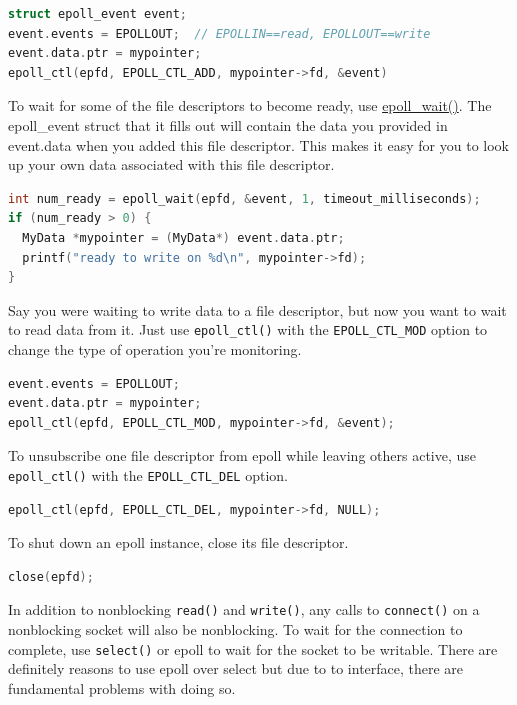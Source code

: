 \begin{lstlisting}[language=C]
struct epoll_event event;
event.events = EPOLLOUT;  // EPOLLIN==read, EPOLLOUT==write
event.data.ptr = mypointer;
epoll_ctl(epfd, EPOLL_CTL_ADD, mypointer->fd, &event)
\end{lstlisting}

To wait for some of the file descriptors to become ready, use \href{http://linux.die.net/man/2/epoll_wait}{epoll\_wait()}. The epoll\_event struct that it fills out will contain the data you provided in event.data when you added this file descriptor. This makes it easy for you to look up your own data associated with this file descriptor.

\begin{lstlisting}[language=C]
int num_ready = epoll_wait(epfd, &event, 1, timeout_milliseconds);
if (num_ready > 0) {
  MyData *mypointer = (MyData*) event.data.ptr;
  printf("ready to write on %d\n", mypointer->fd);
}
\end{lstlisting}

Say you were waiting to write data to a file descriptor, but now you want to wait to read data from it. Just use \texttt{epoll\_ctl()} with the \texttt{EPOLL\_CTL\_MOD} option to change the type of operation you're monitoring.

\begin{lstlisting}[language=C]
event.events = EPOLLOUT;
event.data.ptr = mypointer;
epoll_ctl(epfd, EPOLL_CTL_MOD, mypointer->fd, &event);
\end{lstlisting}

To unsubscribe one file descriptor from epoll while leaving others active, use \texttt{epoll\_ctl()} with the \texttt{EPOLL\_CTL\_DEL} option.

\begin{lstlisting}[language=C]
epoll_ctl(epfd, EPOLL_CTL_DEL, mypointer->fd, NULL);
\end{lstlisting}

To shut down an epoll instance, close its file descriptor.

\begin{lstlisting}[language=C]
close(epfd);
\end{lstlisting}

In addition to nonblocking \texttt{read()} and \texttt{write()}, any calls to \texttt{connect()} on a nonblocking socket will also be nonblocking. To wait for the connection to complete, use \texttt{select()} or epoll to wait for the socket to be writable. There are definitely reasons to use epoll over select but due to to interface, there are fundamental problems with doing so.

